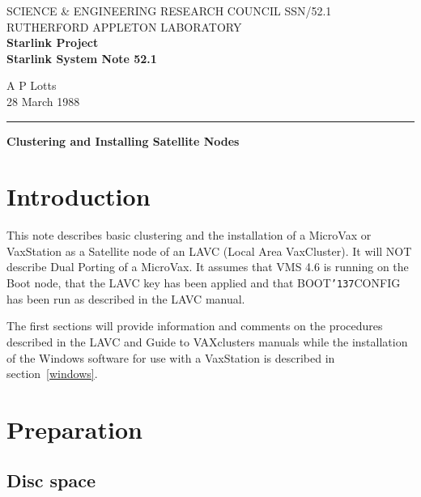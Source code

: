 \pagestyle{myheadings}
\setlength{\textwidth}{160mm}
\setlength{\textheight}{240mm}
\setlength{\topmargin}{-5mm}
\setlength{\oddsidemargin}{0mm}
\setlength{\evensidemargin}{0mm}
\setlength{\parindent}{0mm}
\setlength{\parskip}{\medskipamount}
\setlength{\unitlength}{1mm}
\renewcommand{\_}{{\tt\char'137}}


\thispagestyle{empty}
SCIENCE \& ENGINEERING RESEARCH COUNCIL \hfill SSN/52.1\\
RUTHERFORD APPLETON LABORATORY\\
{\large\bf Starlink Project\\}
{\large\bf Starlink System Note 52.1}
\begin{flushright}
A P Lotts\\
28 March 1988
\end{flushright}
\vspace{-4mm}
\rule{\textwidth}{0.5mm}
\vspace{5mm}
\begin{center}
{\Large\bf Clustering and Installing Satellite Nodes}
\end{center}
\vspace{5mm}

{\setlength{\parskip}{0mm}
\tableofcontents}
\newpage

\section {Introduction}

This note describes basic clustering and the installation of a MicroVax or
VaxStation as a Satellite node of an LAVC (Local Area VaxCluster).
It will NOT describe Dual Porting of a MicroVax.
It assumes that VMS 4.6 is running on the Boot node, that the LAVC key
has been applied and that BOOT\_CONFIG has been run as described in the LAVC
manual.

The first sections will provide information and comments on the procedures
described in the LAVC and Guide to VAXclusters manuals while the installation
of the Windows software for use with a VaxStation is described in
section~\ref{windows}.

\section {Preparation}

\subsection {Disc space}

